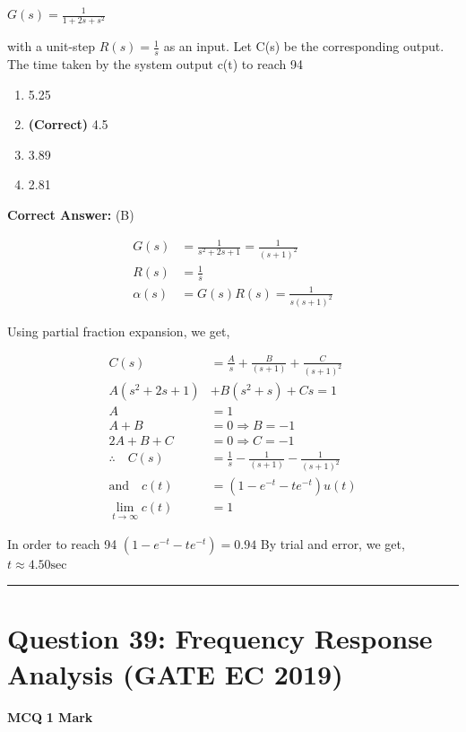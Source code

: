 \documentclass[11pt,a4paper]{article}
\begin{document}
$G(s)=\frac{1}{1+2s+s^2}$

 with a unit-step $R(s)=\frac{1}{s}$ as an input. Let C(s) be the corresponding output. The time taken by the system output c(t) to reach 94%


\begin{enumerate}[label=(\Alph*)]
    \item 5.25
    \item \textbf{(Correct)} 4.5
    \item 3.89
    \item 2.81
\end{enumerate}

\noindent \textbf{Correct Answer:} (B)

\begin{tcolorbox}[solbox, title=Detailed Solution -- Question 38]
\[
\begin{aligned} G(s)&=\frac{1}{s^{2}+2 s+1}=\frac{1}{(s+1)^{2}} \\ R(s)&=\frac{1}{s} \\ \alpha (s)&=G(s) R(s)=\frac{1}{s(s+1)^{2}} \end{aligned}
\]

 Using partial fraction expansion, we get,

\[
\begin{aligned} C(s) & =\frac{A}{s}+\frac{B}{(s+1)}+\frac{C}{(s+1)^{2}} \\ A\left(s^{2}+2 s+1\right)&+B\left(s^{2}+s\right)+C s=1 \\ A&=1 \\ A+B & =0 \Rightarrow B=-1 \\ 2 A+B+C & =0 \Rightarrow C=-1 \\ \therefore \quad C(s) & =\frac{1}{s}-\frac{1}{(s+1)}-\frac{1}{(s+1)^{2}} \\ \text{and}\quad c(t) & =\left(1-e^{-t}-t e^{-t}\right) u(t) \\ \lim _{t \rightarrow \infty} c(t) & =1 \end{aligned}
\]

 In order to reach 94 %
$\left(1-e^{-t}-t e^{-t}\right)=0.94$
 By trial and error, we get,
$t \approx 4.50 \mathrm{sec}$
\end{tcolorbox}

\vspace{1.5em}
\hrule
\vspace{1.5em}

\section*{Question 39: Frequency Response Analysis (GATE EC 2019)}
\noindent \textbf{\color{primary}MCQ} \hfill \textbf{\color{secondary}1 Mark}
\end{document}
